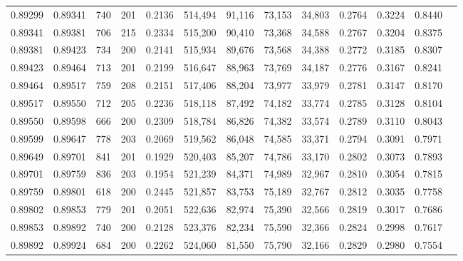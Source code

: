 \begin{tabular}{rrrrrrrrrrrrr}
0.89299 & 0.89341 &   740 & 201 &                                     0.2136 & 514,494 &  91,116 &  73,153 &  34,803 & 0.2764 & 0.3224 & 0.8440 \\
0.89341 & 0.89381 &   706 & 215 &                                     0.2334 & 515,200 &  90,410 &  73,368 &  34,588 & 0.2767 & 0.3204 & 0.8375 \\
0.89381 & 0.89423 &   734 & 200 &                                     0.2141 & 515,934 &  89,676 &  73,568 &  34,388 & 0.2772 & 0.3185 & 0.8307 \\
0.89423 & 0.89464 &   713 & 201 &                                     0.2199 & 516,647 &  88,963 &  73,769 &  34,187 & 0.2776 & 0.3167 & 0.8241 \\
0.89464 & 0.89517 &   759 & 208 &                                     0.2151 & 517,406 &  88,204 &  73,977 &  33,979 & 0.2781 & 0.3147 & 0.8170 \\
0.89517 & 0.89550 &   712 & 205 &                                     0.2236 & 518,118 &  87,492 &  74,182 &  33,774 & 0.2785 & 0.3128 & 0.8104 \\
0.89550 & 0.89598 &   666 & 200 &                                     0.2309 & 518,784 &  86,826 &  74,382 &  33,574 & 0.2789 & 0.3110 & 0.8043 \\
0.89599 & 0.89647 &   778 & 203 &                                     0.2069 & 519,562 &  86,048 &  74,585 &  33,371 & 0.2794 & 0.3091 & 0.7971 \\
0.89649 & 0.89701 &   841 & 201 &                                     0.1929 & 520,403 &  85,207 &  74,786 &  33,170 & 0.2802 & 0.3073 & 0.7893 \\
0.89701 & 0.89759 &   836 & 203 &                                     0.1954 & 521,239 &  84,371 &  74,989 &  32,967 & 0.2810 & 0.3054 & 0.7815 \\
0.89759 & 0.89801 &   618 & 200 &                                     0.2445 & 521,857 &  83,753 &  75,189 &  32,767 & 0.2812 & 0.3035 & 0.7758 \\
0.89802 & 0.89853 &   779 & 201 &                                     0.2051 & 522,636 &  82,974 &  75,390 &  32,566 & 0.2819 & 0.3017 & 0.7686 \\
0.89853 & 0.89892 &   740 & 200 &                                     0.2128 & 523,376 &  82,234 &  75,590 &  32,366 & 0.2824 & 0.2998 & 0.7617 \\
0.89892 & 0.89924 &   684 & 200 &                                     0.2262 & 524,060 &  81,550 &  75,790 &  32,166 & 0.2829 & 0.2980 & 0.7554 \\

\end{tabular}
